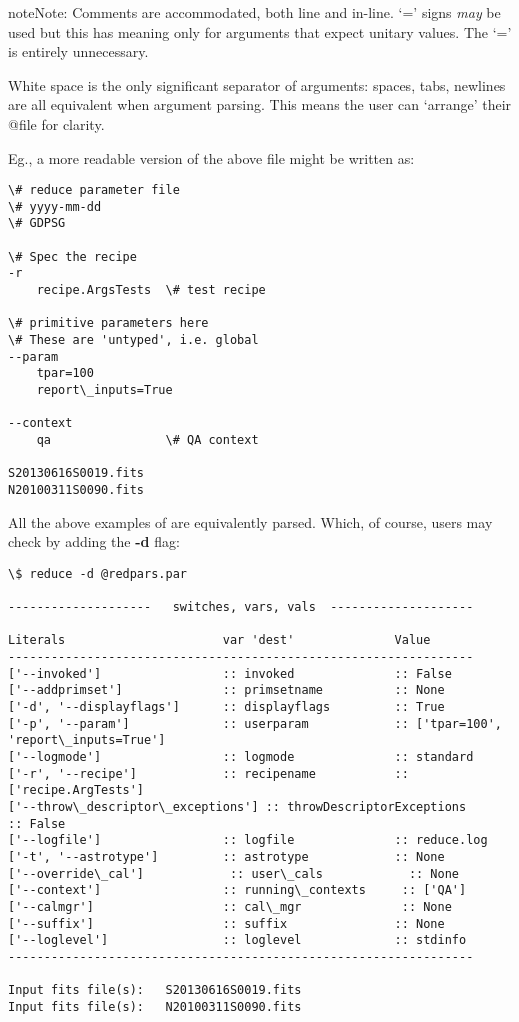 \documentclass[letterpaper,10pt,english]{sphinxmanual}
\begin{document}
\begin{notice}{note}{Note:}
Comments are accommodated, both line and in-line. `=' signs \emph{may} be
used but this has meaning only for arguments that expect unitary
values. The `=' is entirely unnecessary.

White space is the only significant separator of arguments: spaces,
tabs, newlines are all equivalent when argument parsing. This means
the user can `arrange' their @file for clarity.

Eg., a more readable version of the above file might be written as:

\begin{Verbatim}[commandchars=\\\{\}]
\# reduce parameter file
\# yyyy-mm-dd
\# GDPSG

\# Spec the recipe
-r
    recipe.ArgsTests  \# test recipe

\# primitive parameters here
\# These are 'untyped', i.e. global
--param
    tpar=100
    report\_inputs=True

--context
    qa                \# QA context

S20130616S0019.fits
N20100311S0090.fits
\end{Verbatim}
\end{notice}

All the above  examples of  are equivalently parsed. Which,
of course, users may check by adding the \textbf{-d} flag:

\begin{Verbatim}[commandchars=\\\{\}]
\$ reduce -d @redpars.par

--------------------   switches, vars, vals  --------------------

Literals                      var 'dest'              Value
-----------------------------------------------------------------
['--invoked']                 :: invoked              :: False
['--addprimset']              :: primsetname          :: None
['-d', '--displayflags']      :: displayflags         :: True
['-p', '--param']             :: userparam            :: ['tpar=100', 'report\_inputs=True']
['--logmode']                 :: logmode              :: standard
['-r', '--recipe']            :: recipename           :: ['recipe.ArgTests']
['--throw\_descriptor\_exceptions'] :: throwDescriptorExceptions        :: False
['--logfile']                 :: logfile              :: reduce.log
['-t', '--astrotype']         :: astrotype            :: None
['--override\_cal']            :: user\_cals            :: None
['--context']                 :: running\_contexts     :: ['QA']
['--calmgr']                  :: cal\_mgr              :: None
['--suffix']                  :: suffix               :: None
['--loglevel']                :: loglevel             :: stdinfo
-----------------------------------------------------------------

Input fits file(s):   S20130616S0019.fits
Input fits file(s):   N20100311S0090.fits
\end{Verbatim}
\end{document}
